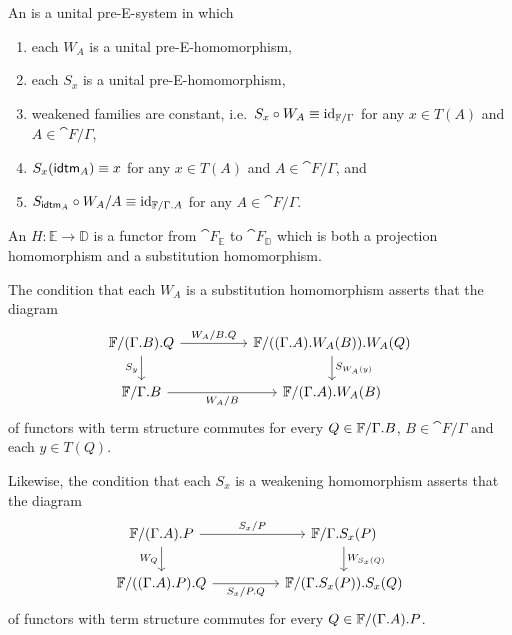 \begin{defn}
\label{defn:esystems}
An  is a unital pre-E-system in which 
\begin{enumerate}
\item each $W_A$ is a unital pre-E-homomorphism,
\item each $S_x$ is a unital pre-E-homomorphism,
\item \label{tTf:StWf_id} weakened families are constant, i.e.~$S_x\circ W_A\equiv {\mathrm{id}_{\mathbb{F}/\Gamma}}$ for any $x\in T(A)$ and $A\in\cat{F}/\Gamma$,
\item $S_x(\tfid{A})\jdeq x$ for any $x\in T(A)$ and $A\in\cat{F}/\Gamma$, and
\item \label{f:SidfWff_id} $S_{\tfid{A}}\circ W_A/A\jdeq \catid{\cat{F}/\ctxext{\Gamma}{A}}$ for any $A\in\cat{F}/\Gamma$.
\end{enumerate}
An  $H:\mathbb{E}\to\mathbb{D}$ is a functor from
$\cat{F}_{\mathbb{E}}$ to $\cat{F}_{\mathbb{D}}$ which is both a projection
homomorphism and a substitution homomorphism.
\end{defn}

\begin{rmk}
The condition that each $W_A$ is a substitution homomorphism asserts that
the diagram
\begin{equation*}
\begin{tikzcd}[column sep=huge]
\cat{F}/\ctxext{{\Gamma}{B}}{Q}
  \arrow[r,"W_A/\ctxext{B}{Q}"]
  \arrow[d,swap,"S_y"]
  &
\cat{F}/\ctxext{{{\Gamma}{A}}{W_A(B)}}{W_A(Q)}
  \arrow[d,"S_{W_A(y)}"]
  \\
\cat{F}/\ctxext{\Gamma}{B}
  \arrow[r,swap,"W_A/B"]
  &
\cat{F}/\ctxext{{\Gamma}{A}}{W_A(B)}
\end{tikzcd}
\end{equation*}
of functors with term structure commutes for every 
$Q\in\cat{F}/\ctxext{\Gamma}{B}$, $B\in\cat{F}/\Gamma$ and each $y\in T(Q)$.

Likewise, the condition that each $S_x$ is a weakening homomorphism
asserts that the diagram
\begin{equation*}
\begin{tikzcd}[column sep=huge]
\cat{F}/\ctxext{{\Gamma}{A}}{P}
  \arrow[r,"S_x/P"]
  \arrow[d,swap,"W_Q"]
  &
\cat{F}/\ctxext{\Gamma}{S_x(P)}
  \arrow[d,"W_{S_x(Q)}"]
  \\
\cat{F}/\ctxext{{{\Gamma}{A}}{P}}{Q}
  \arrow[r,swap,"S_x/\ctxext{P}{Q}"]
  &
\cat{F}/\ctxext{{\Gamma}{S_x(P)}}{S_x(Q)}
\end{tikzcd}
\end{equation*}
of functors with term structure commutes for every 
$Q\in\cat{F}/\ctxext{{\Gamma}{A}}{P}$.
\end{rmk}

